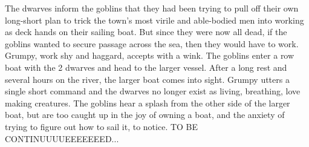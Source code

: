 The dwarves inform the goblins that they had been trying to pull off their own long-short plan to trick the town’s most virile and able-bodied men into working as deck hands on their sailing boat. But since they were now all dead, if the goblins wanted to secure passage across the sea, then they would have to work. Grumpy, work shy and haggard, accepts with a wink.\medskip
The goblins enter a row boat with the 2 dwarves and head to the larger vessel. After a long rest and several hours on the river, the larger boat comes into sight. Grumpy utters a single short command and the dwarves no longer exist as living, breathing, love making creatures. The goblins hear a splash from the other side of the larger boat, but are too caught up in the joy of owning a boat, and the anxiety of trying to figure out how to sail it, to notice.\medskip
TO BE CONTINUUUUEEEEEEED...